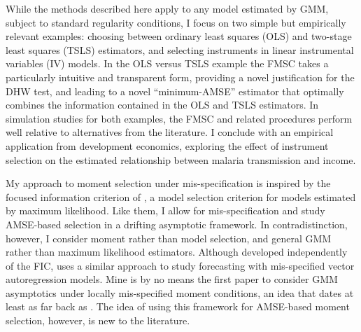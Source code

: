 While the methods described here apply to any model estimated by GMM, subject to standard regularity conditions, I focus on two simple but empirically relevant examples: choosing between ordinary least squares (OLS) and two-stage least squares (TSLS) estimators, and selecting instruments in linear instrumental variables (IV) models. 
In the OLS versus TSLS example the FMSC takes a particularly intuitive and transparent form, providing a novel justification for the DHW test, and leading to a novel ``minimum-AMSE'' estimator that optimally combines the information contained in the OLS and TSLS estimators.
In simulation studies for both examples, the FMSC and related procedures perform well relative to alternatives from the literature. 
I conclude with an empirical application from development economics, exploring the effect of instrument selection on the estimated relationship between malaria transmission and income.

My approach to moment selection under mis-specification is inspired by the focused information criterion of \citet{ClaeskensHjort2003}, a model selection criterion for models estimated by maximum likelihood. 
Like them, I allow for mis-specification and study AMSE-based selection in a drifting asymptotic framework. 
In contradistinction, however, I consider moment rather than model selection, and general GMM rather than maximum likelihood estimators.
Although developed independently of the FIC, \cite{Schorfheide2005} uses a similar approach to study forecasting with mis-specified vector autoregression models.
Mine is by no means the first paper to consider GMM asymptotics under locally mis-specified moment conditions, an idea that dates at least as far back as \cite{Newey1985}.
The idea of using this framework for AMSE-based moment selection, however, is new to the literature. 

